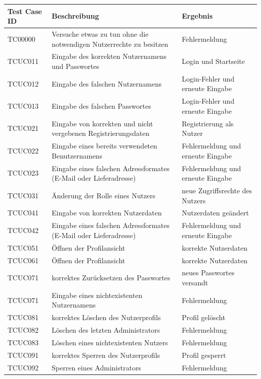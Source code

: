 \documentclass[a4paper]{article}
\begin{document}
\begin{longtable}{|p{50px}|p{200px}|p{100px}|}
	\hline
	\rowcolor[HTML]{C0C0C0} 
	Test Case ID & Beschreibung & Ergebnis \\ \hline
	TC00000 & Versuche etwas zu tun ohne die notwendigen Nutzerrechte zu besitzen & Fehlermeldung \\ \hline
	TCUC011 & Eingabe des korrekten Nutzernamens und Passwortes & Login und Startseite \\ \hline
	TCUC012 & Eingabe des falschen Nutzernamens & Login-Fehler und erneute Eingabe \\ \hline
	TCUC013 & Eingabe des falschen Passwortes & Login-Fehler und erneute Eingabe \\ \hline
	TCUC021 & Eingabe von korrekten und nicht vergebenen Registrierungsdaten & Registrierung als Nutzer \\ \hline
	TCUC022 & Eingabe eines bereits verwendeten Benutzernamens & Fehlermeldung und erneute Eingabe \\ \hline
	TCUC023 & Eingabe eines falschen Adressformates (E-Mail oder Lieferadresse) & Fehlermeldung und erneute Eingabe \\ \hline
	TCUC031 & Änderung der Rolle eines Nutzers & neue Zugriffsrechte des Nutzers \\ \hline
	TCUC041 & Eingabe von korrekten Nutzerdaten & Nutzerdaten geändert \\ \hline
	TCUC042 & Eingabe eines falschen Adressformates (E-Mail oder Lieferadresse) & Fehlermeldung und erneute Eingabe \\ \hline
	TCUC051 & Öffnen der Profilansicht & korrekte Nutzerdaten \\ \hline
	TCUC061 & Öffnen der Profilansicht & korrekte Nutzerdaten \\ \hline
	TCUC071 & korrektes Zurücksetzen des Passwortes & neues Passwortes versandt \\ \hline
	TCUC071 & Eingabe eines nichtexistenten Nutzernamens & Fehlermeldung \\ \hline
	TCUC081 & korrektes Löschen des Nutzerprofils & Profil gelöscht \\ \hline
	TCUC082 & Löschen des letzten Administrators & Fehlermeldung \\ \hline
	TCUC083 & Löschen eines nichtexistenten Nutzers & Fehlermeldung \\ \hline
	TCUC091 & korrektes Sperren des Nutzerprofils & Profil gesperrt \\ \hline
	TCUC092 & Sperren eines Administrators & Fehlermeldung \\ \hline

\end{longtable}
\end{document}
